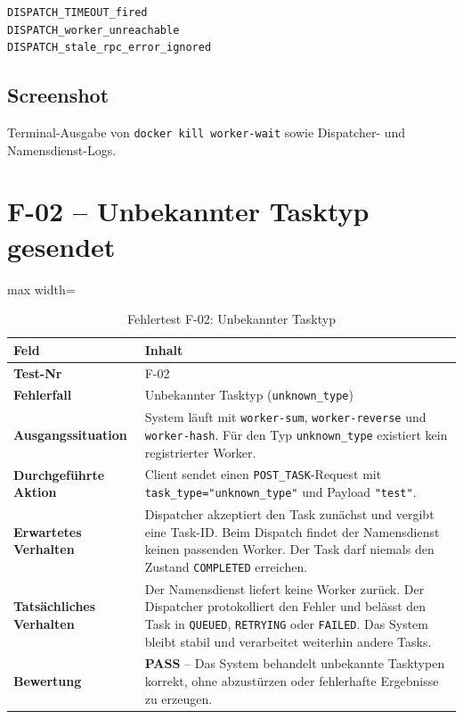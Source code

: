 \documentclass[a4paper,12pt]{article}
\begin{document}
\begin{lstlisting}[style=log]
DISPATCH_TIMEOUT_fired
DISPATCH_worker_unreachable
DISPATCH_stale_rpc_error_ignored
\end{lstlisting}

\subsection*{Screenshot}

Terminal-Ausgabe von \texttt{docker kill worker-wait} sowie Dispatcher- und Namensdienst-Logs.

\newpage
\section*{F-02 -- Unbekannter Tasktyp gesendet}

\begin{table}[H]
    \centering
    \begin{adjustbox}{max width=\textwidth}
    \begin{tabular}{>{\bfseries}p{4.5cm} p{10cm}}
        \toprule
        Feld & Inhalt \\
        \midrule
        Test-Nr              & F-02 \\
        Fehlerfall           & Unbekannter Tasktyp (\texttt{unknown\_type}) \\
        Ausgangssituation    & System läuft mit \texttt{worker-sum}, \texttt{worker-reverse}
                               und \texttt{worker-hash}.
                               Für den Typ \texttt{unknown\_type} existiert kein registrierter Worker. \\
        Durchgeführte Aktion & Client sendet einen \texttt{POST\_TASK}-Request mit
                               \texttt{task\_type="unknown\_type"} und Payload \texttt{"test"}. \\
        Erwartetes Verhalten & Dispatcher akzeptiert den Task zunächst und vergibt eine Task-ID.
                               Beim Dispatch findet der Namensdienst keinen passenden Worker.
                               Der Task darf niemals den Zustand \texttt{COMPLETED} erreichen. \\
        Tatsächliches Verhalten & Der Namensdienst liefert keine Worker zurück.
                               Der Dispatcher protokolliert den Fehler und belässt den Task in
                               \texttt{QUEUED}, \texttt{RETRYING} oder \texttt{FAILED}.
                               Das System bleibt stabil und verarbeitet weiterhin andere Tasks. \\
        Bewertung            & \textbf{PASS} -- Das System behandelt unbekannte Tasktypen korrekt,
                               ohne abzustürzen oder fehlerhafte Ergebnisse zu erzeugen. \\
        \bottomrule
    \end{tabular}
    \end{adjustbox}
    \caption{Fehlertest F-02: Unbekannter Tasktyp}
\end{table}
\end{document}
